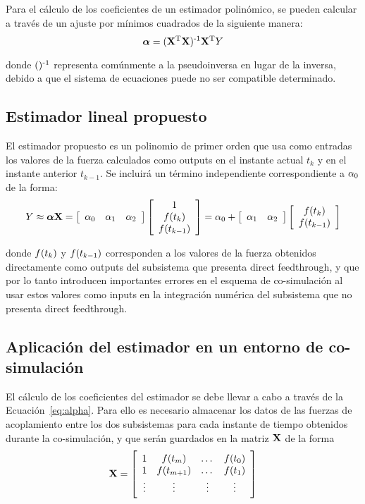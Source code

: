 Para el cálculo de los coeficientes de un estimador polinómico, se pueden calcular a través de un ajuste por mínimos cuadrados de la siguiente manera:
%
\begin{equation}
    \coefficients = (\estimation\trans \estimation)\inv \estimation\trans \estimated
    \label{eq:alpha}
\end{equation}

donde $()\inv$ representa comúnmente a la pseudoinversa en lugar de la inversa, debido a que el sistema de ecuaciones puede no ser compatible determinado.

\subsection{Estimador lineal propuesto}

El estimador propuesto es un polinomio de primer orden que usa como entradas los valores de la fuerza calculados como outputs en el instante actual $t_k$ y en el instante anterior $t_{k-1}$. Se incluirá un término independiente correspondiente a $\coefficient_0$ de la forma:
%
\begin{equation}
    \estimated \approx \coefficients \estimation = \sqbr{\hvect{ccc}{\coefficient_0 & \coefficient_1 & \coefficient_2}} \sqbr{\cvvect{1 \\ \forceMod (t_k) \\ \forceMod (t_{k-1})}} = \coefficient_0 + \sqbr{\hvect{cc}{\coefficient_1 & \coefficient_2}} \sqbr{\cvvect{\forceMod (t_k) \\ \forceMod (t_{k-1})}}
\end{equation}

donde $\forceMod (t_k)$ y $\forceMod (t_{k-1})$ corresponden a los valores de la fuerza obtenidos directamente como outputs del subsistema que presenta direct feedthrough, y que por lo tanto introducen importantes errores en el esquema de co-simulación al usar estos valores como inputs en la integración numérica del subsistema que no presenta direct feedthrough.


\subsection{Aplicación del estimador en un entorno de co-simulación}

El cálculo de los coeficientes del estimador se debe llevar a cabo a través de la Ecuación~\eqref{eq:alpha}. Para ello es necesario almacenar los datos de las fuerzas de acoplamiento entre los dos subsistemas para cada instante de tiempo obtenidos durante la co-simulación, y que serán guardados en la matriz $\estimation$ de la forma
%
\begin{equation}
    \estimation = \sqbr{\matr{cccc}
    {1 & \forceMod (t_m) & \dots &\forceMod (t_0) \\
    1 & \forceMod (t_{m+1}) & \dots & \forceMod (t_1) \\
    \vdots & \vdots & \vdots &\vdots}} 
\end{equation}


